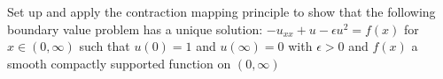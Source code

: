 Set up and apply the contraction mapping principle to show that the
following boundary value problem has a unique
solution: $-u_{xx}+u-\epsilon u^2 = f(x)$ for $x\in (0,\infty)$ such
that $u(0)=1$ and $u(\infty)=0$ with $\epsilon>0$ and $f(x)$ a smooth
compactly supported function on $(0,\infty)$
